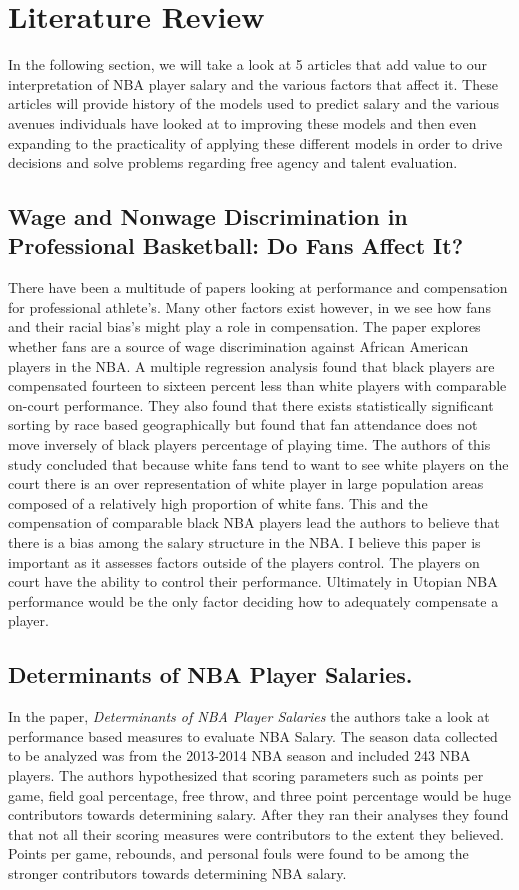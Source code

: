 \documentclass[12pt,english]{article}
\begin{document}
\section{Literature Review}\label{sec:litreview}

\indent In the following section, we will take a look at 5 articles that add value to our interpretation of NBA player salary and the various factors that affect it. These articles will provide history of the models used to predict salary and the various avenues individuals have looked at to improving these models and then even expanding to the practicality of applying these different models in order to drive decisions and solve problems regarding free agency and talent evaluation.
\subsection{Wage and Nonwage Discrimination in Professional Basketball: Do Fans Affect It?}There have been a multitude of papers looking at performance and compensation for professional athlete's. Many other factors exist however, in \cite{10.2307/3487275} we see how fans and their racial bias's might play a role in compensation. The paper explores whether fans are a source of wage discrimination against African American players in the NBA. A multiple regression analysis found that black players are compensated fourteen to sixteen percent less than white players with comparable on-court performance. They also found that there exists statistically significant sorting by race based geographically but found that fan attendance does not move inversely of black players percentage of playing time. The authors of this study concluded that because white fans tend to want to see white players on the court there is an over representation of white player in large population areas composed of a relatively high proportion of white fans. This and the compensation of comparable black NBA players lead the authors to believe that there is a bias among the salary structure in the NBA. I believe this paper is important as it assesses factors outside of the players control. The players on court have the ability to control their performance. Ultimately in Utopian NBA performance would be the only factor deciding how to adequately compensate a player.
\subsection{Determinants of NBA Player Salaries.}
In the paper, \textit{Determinants of NBA Player Salaries} \cite{detersal132} the authors take a look at performance based measures to evaluate NBA Salary. The season data collected to be analyzed was from the 2013-2014 NBA season and included 243 NBA players. The authors hypothesized that scoring parameters such as points per game, field goal percentage, free throw, and three point percentage would be huge contributors towards determining salary. After they ran their analyses they found that not all their scoring measures were contributors to the extent they believed. Points per game, rebounds, and personal fouls were found to be among the stronger contributors towards determining NBA salary.
\end{document}
